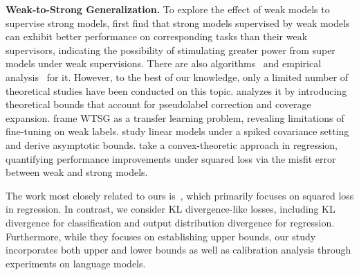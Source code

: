 \noindent \textbf{Weak-to-Strong Generalization.}
To explore the effect of weak models to supervise strong models, \citet{burns2023weak} first find that strong models supervised by weak models can exhibit better performance on corresponding tasks than their weak supervisors, indicating the possibility of stimulating greater power from super models under weak supervisions.
There are also algorithms~\citep{zhu2024weak,agrawal2024ensemw2s,sang2024improving,guo2024improving} and empirical analysis~\citep{yang2024super,ye2024weak} for it.
However, to the best of our knowledge, only a limited number of theoretical studies have been conducted on this topic.
\citet{lang2024theoretical} analyzes it by introducing theoretical bounds that account for pseudolabel correction and coverage expansion. \citet{somerstep2024statistical} frame WTSG as a transfer learning problem, revealing limitations of fine-tuning on weak labels. \citet{wu2024provable} study linear models under a spiked covariance setting and derive asymptotic bounds. \citet{charikar2024quantifying} take a convex-theoretic approach in regression, quantifying performance improvements under squared loss via the misfit error between weak and strong models.

The work most closely related to ours is~\citet{charikar2024quantifying}, which primarily focuses on squared loss in regression. 
In contrast, we consider KL divergence-like losses, including KL divergence for classification and output distribution divergence for regression. 
Furthermore, while they focuses on establishing upper bounds, our study incorporates both upper and lower bounds as well as calibration analysis through experiments on language models.




